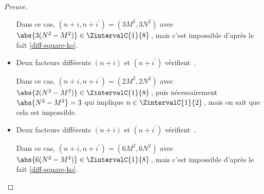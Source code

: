 \begin{proof}[Preuve]
\begin{itemize}
		\smallskip
		\noindent
		Dans ce cas, $(n+i, n+i^\prime) = (3 M^2, 3 N^2)$ avec $\abs{3(N^2 - M^2)} \in \ZintervalC{1}{8}$\,, mais c'est impossible d'après le fait \ref{diff-square-ko}.

    	\medskip
		\item Deux facteurs différents $(n+i)$ et $(n+i^\prime)$ vérifient \,.
		
		\smallskip
		\noindent
		Dans ce cas, $(n+i, n+i^\prime) = (2 M^2, 2 N^2)$ avec $\abs{2(N^2 - M^2)} \in \ZintervalC{1}{8}$\,, puis nécessairement $\abs{N^2 - M^2} = 3$ qui implique $n \in \ZintervalC{1}{2}$\,, mais on sait que cela est impossible.


    	\medskip
		\item Deux facteurs différents $(n+i)$ et $(n+i^\prime)$ vérifient \,.
		
		\smallskip
		\noindent
		Dans ce cas, $(n+i, n+i^\prime) = (6 M^2, 6 N^2)$ avec $\abs{6(N^2 - M^2)} \in \ZintervalC{1}{8}$\,, mais c'est impossible d'après le fait \ref{diff-square-ko}.
		\qedhere
    \end{itemize}
\end{proof}

